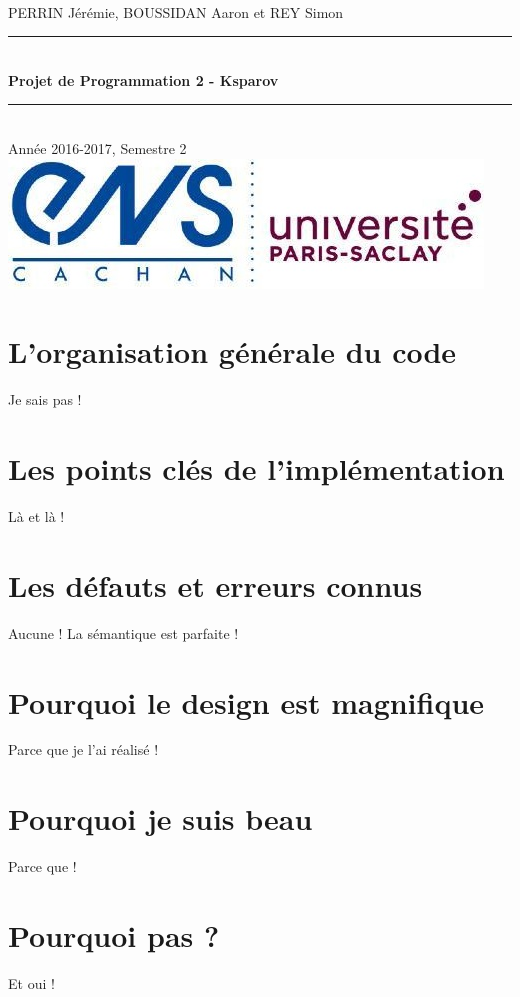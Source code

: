 \documentclass[a4paper]{article}
\newcommand{\HRule}{\rule{\linewidth}{0.5mm}}
\begin{document}
\begin{titlepage}
~\\
PERRIN Jérémie, BOUSSIDAN Aaron et REY Simon\\[5cm]
\begin{center}
\HRule 
\\[0.4cm]{\huge\bfseries Projet de Programmation 2 - Ksparov\\[0.4cm]}
\HRule \\[0.5cm] 
Année 2016-2017, Semestre 2\\[12cm]
\includegraphics[scale=0.7]{Images/Logo_ENS_PS.jpg}
\end{center}
\end{titlepage}
\tableofcontents

\newpage

\section{L'organisation générale du code}

Je sais pas !

\section{Les points clés de l'implémentation}

Là et là !

\section{Les défauts et erreurs connus}

Aucune ! La sémantique est parfaite !

\section{Pourquoi le design est magnifique}

Parce que je l'ai réalisé !

\section{Pourquoi je suis beau}

Parce que !

\section{Pourquoi pas ?}

Et oui !
\end{document}

